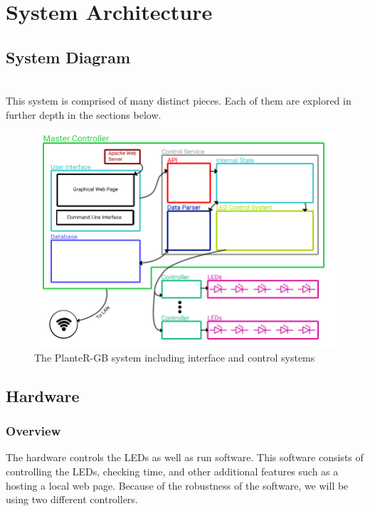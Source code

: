 \documentclass[onecolumn, draftclsnofoot,10pt, compsoc]{IEEEtran}
\begin{document}
	\section{System Architecture}
		\subsection{System Diagram}

		\noindent \\This system is comprised of many distinct pieces. Each of them are explored in further depth in the sections below.

		\begin{center}
			\begin{figure}[H]
				\includegraphics[width=\linewidth]{systemDiagrams/systemdiag.png}
				\caption{The PlanteR-GB system including interface and control systems}
				\label{fig:systemDiagram}
			\end{figure}
		\end{center}

		\subsection{Hardware}
			\subsubsection{Overview}
			\noindent The hardware controls the LEDs as well as run software. This software
			consists of controlling the LEDs, checking time, and other additional
			features such as a hosting a local web page. Because of the robustness of
			the software, we will be using two different controllers.
\end{document}
